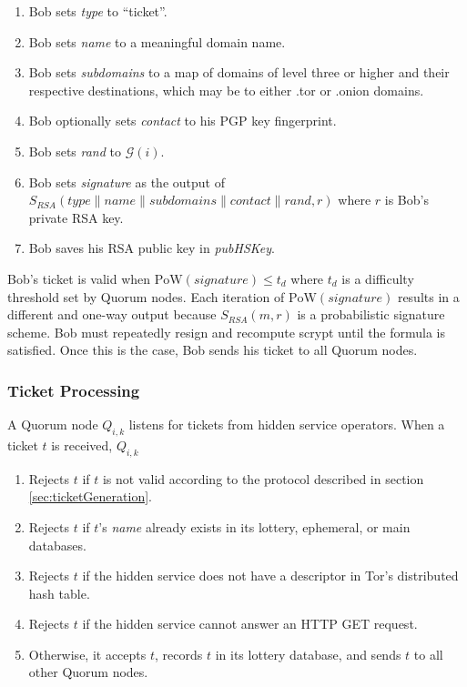 \documentclass[USenglish,oneside,twocolumn]{article}
\newcommand*\concat{\mathbin{\|}}
\begin{document}
\begin{enumerate}
	\item Bob sets \emph{type} to ``ticket''.
	\item Bob sets \emph{name} to a meaningful domain name.
	\item Bob sets \emph{subdomains} to a map of domains of level three or higher and their respective destinations, which may be to either .tor or .onion domains.
	\item Bob optionally sets \emph{contact} to his PGP key fingerprint.
	\item Bob sets \emph{rand} to $ \mathcal{G}(i) $.
	\item Bob sets \emph{signature} as the output of $ S_{\mathit{RSA}}(\mathit{type} \concat \mathit{name} \concat \mathit{subdomains} \concat \mathit{contact} \concat \mathit{rand}, r) $ where $ r $ is Bob's private RSA key.
	\item Bob saves his RSA public key in \emph{pubHSKey}.
\end{enumerate}

Bob's ticket is valid when $ \mathrm{PoW}(\mathit{signature}) \leq t_{d} $ where $ t_{d} $ is a difficulty threshold set by Quorum nodes. Each iteration of $ \mathrm{PoW}(\mathit{signature}) $ results in a different and one-way output because $ S_{\mathit{RSA}}(m, r) $ is a probabilistic signature scheme. Bob must repeatedly resign and recompute scrypt until the formula is satisfied. Once this is the case, Bob sends his ticket to all Quorum nodes.

\subsubsection{Ticket Processing}

A Quorum node $ Q_{i,k} $ listens for tickets from hidden service operators. When a ticket $ t $ is received, $ Q_{i,k} $

\begin{enumerate}
	\item Rejects $ t $ if $ t $ is not valid according to the protocol described in section \ref{sec:ticketGeneration}.
	\item Rejects $ t $ if $ t $'s \emph{name} already exists in its lottery, ephemeral, or main databases.
	\item Rejects $ t $ if the hidden service does not have a descriptor in Tor's distributed hash table.
	\item Rejects $ t $ if the hidden service cannot answer an HTTP GET request.
	\item Otherwise, it accepts $ t $, records $ t $ in its lottery database, and sends $ t $ to all other Quorum nodes.
\end{enumerate}
\end{document}
